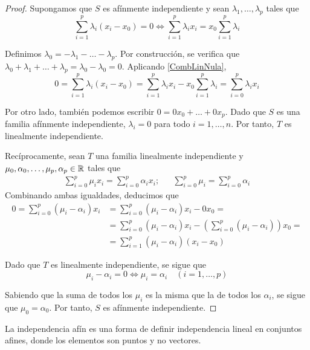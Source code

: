 \begin{proof}
	Supongamos que $S$ es afínmente independiente y sean $\lambda_1,\dots, \lambda_p$ tales que
	\begin{equation}\label{CombLinNula}
		\sum^p_{i=1}\lambda_i(x_i-x_0)=0 \iff \sum^p_{i=1}\lambda_ix_i=x_0\sum^p_{i=1}\lambda_i
	\end{equation}

Definimos $\lambda_0=-\lambda_1-\dots-\lambda_p$.
Por construcción, se verifica que $\lambda_0+\lambda_1+\dots+\lambda_p=\lambda_0-\lambda_0=0$.
Aplicando \eqref{CombLinNula},
	\[0=\sum^p_{i=1}\lambda_i(x_i-x_0)=\sum^p_{i=1}\lambda_i x_i-x_0\sum^p_{i=1}\lambda_i=\sum^p_{i=0}\lambda_i x_i\]

Por otro lado, también podemos escribir $0=0x_0+\dots+0x_p$.
Dado que $S$ es una familia afínmente independiente, $\lambda_i=0$ para todo $i=1,\dots,n$.
Por tanto, $T$ es linealmente independiente.

Recíprocamente, sean $T$ una familia linealmente independiente y $\mu_0,\alpha_0,\dots,\mu_p,\alpha_p \in \mathbb{R}$ tales que
\begin{align*}
	\sum_{i=0}^p \mu_ix_i=\sum_{i=0}^p \alpha_ix_i; && \sum_{i=0}^p \mu_i=\sum_{i=0}^p \alpha_i
\end{align*}
Combinando ambas igualdades, deducimos que
\begin{align*}
0=\sum^p_{i=0}(\mu_i-\alpha_i)x_i
	&=\sum^p_{i=0}(\mu_i-\alpha_i)x_i-0x_0=\\
	&=\sum^p_{i=0}(\mu_i-\alpha_i)x_i-
	\left(\sum^p_{i=0}(\mu_i-\alpha_i)\right)x_0=\\
	&=\sum^p_{i=1}(\mu_i-\alpha_i)(x_i-x_0)
\end{align*}

Dado que $T$ es linealmente independiente, se sigue que
	\[\mu_i-\alpha_i=0 \iff \mu_i=\alpha_i \quad (i=1,\dots, p)\]

Sabiendo que la suma de todos los $\mu_i$ es la misma que la de todos los $\alpha_i$, se sigue que $\mu_0=\alpha_0$.
Por tanto, $S$ es afínmente independiente.
\end{proof}

\begin{marginfigure}
\caption[Puntos afínmente independientes]{La independencia afín es una forma de definir independencia lineal en conjuntos afines, donde los elementos son puntos y no vectores.}
\end{marginfigure}

